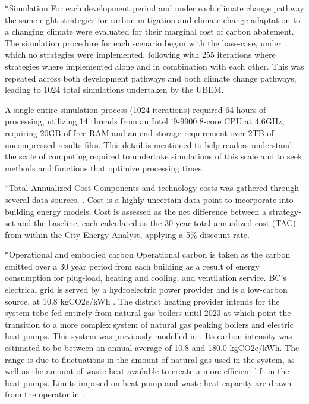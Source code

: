 \documentclass[twocolumn, a4paper,10pt]{article}
\makeatletter
\renewcommand\subsection{\@startsection{subsection}{1}{\z@}{\z@}{\z@}{\normalfont\normalsize\bfseries}}
\renewcommand\subsection{\@startsection{subsection}{1}{\z@}{\z@}{0.1pt}{\normalfont\normalsize\bfseries}}
\makeatother
\begin{document}
\subsection*{Simulation}
For each development period and under each climate change pathway the same eight strategies for carbon mitigation and climate change adaptation to a changing climate were evaluated for their marginal cost of carbon abatement. The simulation procedure for each scenario began with the base-case, under which no strategies were implemented, following with 255 iterations where strategies where implemented alone and in combination with each other. This was repeated across both development pathways and both climate change pathways, leading to 1024 total simulations undertaken by the UBEM.


A single entire simulation process (1024 iterations) required 64 hours of processing, utilizing 14 threads from an Intel i9-9900 8-core CPU at 4.6GHz, requiring 20GB of free RAM and an end storage requirement over 2TB of uncompressed results files. This detail is mentioned to help readers understand the scale of computing required to undertake simulations of this scale and to seek methods and functions that optimize processing times. 

\subsection*{Total Annualized Cost}
Components and technology costs was gathered through several data sources, \citep{noauthor_cpcn_2014,schlueter_3for2_2016,salasovich_energy_2016,kegel_life_nodate,gordian_rsmeans_2020}. Cost is a highly uncertain data point to incorporate into building energy models. Cost is assessed as the net difference between a strategy-set and the baseline, each calculated as the 30-year total annualized cost (TAC) from within the City Energy Analyst, applying a 5\% discount rate.

\subsection*{Operational and embodied carbon}
Operational carbon is taken as the carbon emitted over a 30 year period from each building as a result of energy consumption for plug-load, heating and cooling, and ventilation service. BC's electrical grid is served by a hydroelectric power provider and is a low-carbon source, at 10.8 kgCO2e/kWh \citep{bc_ministry_of_envrionmetn_and_climate_change_strategy_bc_2019}. The district heating provider intends for the system tobe  fed entirely from natural gas boilers until 2023 at which point the transition to a more complex system of natural gas peaking boilers and electric heat pumps. This system was previously modelled in \citet{mccarty_accepted_2020}. Its carbon intensity was estimated to be between an annual average of 10.8 and 180.0 kgCO2e/kWh. The range is due to fluctuations in the amount of natural gas used in the system, as well as the amount of waste heat available to create a more efficient lift in the heat pumps. Limits imposed on heat pump and waste heat capacity are drawn from the operator in \citet{noauthor_infrastructure_2014}.
\end{document}
